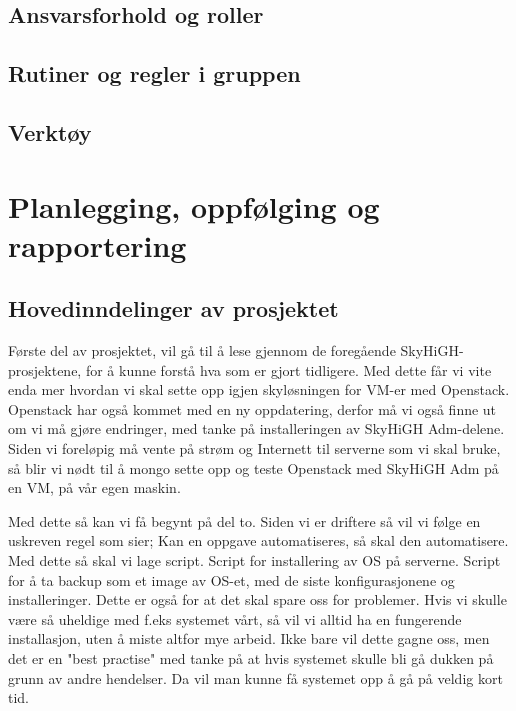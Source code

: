 \documentclass[12pt,a4paper]{article}
\begin{document}
\subsection{Ansvarsforhold og roller}
\subsection{Rutiner og regler i gruppen}
\subsection{Verktøy}

\section{Planlegging, oppfølging og rapportering}
\subsection{Hovedinndelinger av prosjektet}
Første del av prosjektet, vil gå til å lese gjennom de foregående SkyHiGH-prosjektene, for å kunne forstå hva som er 
gjort tidligere. Med dette får vi vite enda mer hvordan vi skal sette opp igjen skyløsningen for VM-er med Openstack.
Openstack har også kommet med en ny oppdatering, derfor må vi også finne ut om vi må gjøre endringer, med tanke på installeringen 
av SkyHiGH Adm-delene. Siden vi foreløpig må vente på strøm og Internett til serverne som vi skal bruke, så blir vi nødt til å mongo
sette opp og teste Openstack med SkyHiGH Adm på en VM, på vår egen maskin. \newline \newline

Med dette så kan vi få begynt på del to. Siden vi er driftere så vil vi følge en uskreven regel som sier; Kan en oppgave automatiseres, så skal den automatisere.
Med dette så skal vi lage script. Script for installering av OS på serverne. Script for å ta backup som et image av OS-et, med de siste konfigurasjonene og installeringer.
Dette er også for at det skal spare oss for problemer. Hvis vi skulle være så uheldige med f.eks systemet vårt, så vil vi alltid ha en fungerende installasjon, uten å miste
altfor mye arbeid. Ikke bare vil dette gagne oss, men det er en "best practise" med tanke på at hvis systemet skulle bli gå dukken på grunn av andre hendelser. Da vil 
man kunne få systemet opp å gå på veldig kort tid. \newline \newline
\end{document}
